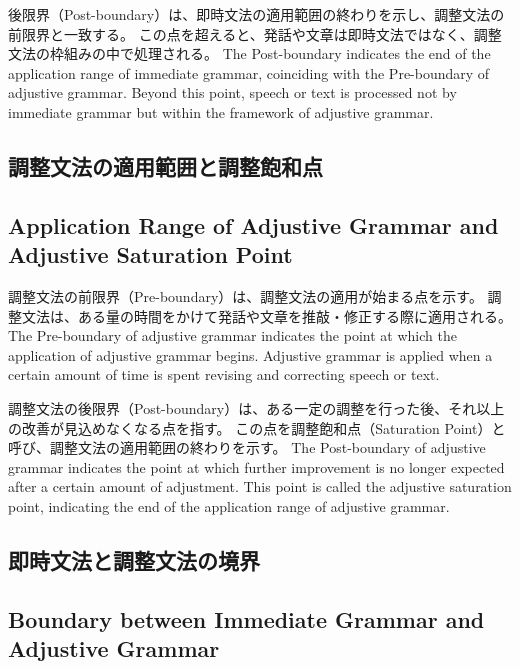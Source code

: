 \documentclass[a4paper,xelatex,ja=standard]{bxjsarticle}
\begin{document}
\ifJPN
後限界（Post-boundary）は、即時文法の適用範囲の終わりを示し、調整文法の前限界と一致する。  
この点を超えると、発話や文章は即時文法ではなく、調整文法の枠組みの中で処理される。  
\else
The Post-boundary indicates the end of the application range of immediate grammar, coinciding with the Pre-boundary of adjustive grammar.
Beyond this point, speech or text is processed not by immediate grammar but within the framework of adjustive grammar.
\fi

\ifJPN
\subsection{調整文法の適用範囲と調整飽和点}
\else
\subsection{Application Range of Adjustive Grammar and Adjustive Saturation Point}
\fi

\ifJPN
調整文法の前限界（Pre-boundary）は、調整文法の適用が始まる点を示す。  
調整文法は、ある量の時間をかけて発話や文章を推敲・修正する際に適用される。  
\else
The Pre-boundary of adjustive grammar indicates the point at which the application of adjustive grammar begins.
Adjustive grammar is applied when a certain amount of time is spent revising and correcting speech or text.
\fi

\ifJPN
調整文法の後限界（Post-boundary）は、ある一定の調整を行った後、それ以上の改善が見込めなくなる点を指す。  
この点を調整飽和点（Saturation Point）と呼び、調整文法の適用範囲の終わりを示す。
\else
The Post-boundary of adjustive grammar indicates the point at which further improvement is no longer expected after a certain amount of adjustment.
This point is called the adjustive saturation point, indicating the end of the application range of adjustive grammar.
\fi

\ifJPN
\subsection{即時文法と調整文法の境界}
\else
\subsection{Boundary between Immediate Grammar and Adjustive Grammar}
\fi
\end{document}

